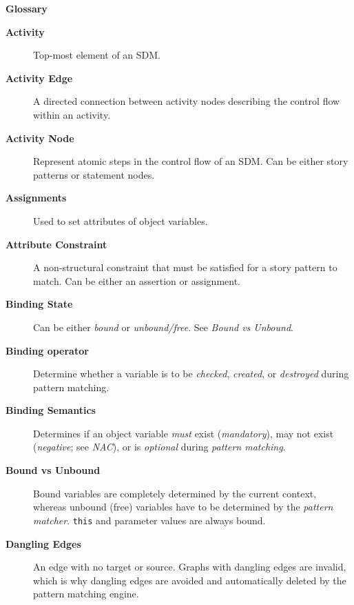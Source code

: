 \newpage
{}
{}
\hypertarget{glossary}{}

\vspace{1cm}
{\Huge \bf Glossary}
\vspace{1cm}

\begin{description}

\item[\bf Activity]
Top-most element of an SDM.

\item[\bf Activity Edge]
A directed connection between activity nodes describing the control flow within an activity.

\item[\bf Activity Node]
Represent atomic steps in the control flow of an SDM. Can be either story patterns or statement nodes.

\item[\bf Assignments]
Used to set attributes of object variables.

\item[\bf Attribute Constraint]
A non-structural constraint that must be satisfied for a story pattern to match. Can be either an assertion or assignment.

\item[\bf Binding State]
Can be either \emph{bound} or \emph{unbound/free}. See \emph{Bound vs Unbound}.

\item[\bf Binding operator]
Determine whether a variable is to be \emph{checked}, \emph{created}, or \emph{destroyed} during pattern matching.

\item[\bf Binding Semantics]
Determines if an object variable \emph{must} exist (\emph{mandatory}), may not exist (\emph{negative}; see \emph{NAC}), or is \emph{optional} during
\emph{pattern matching}.

\item[\bf Bound vs Unbound]
Bound variables are completely determined by the current context, whereas unbound (free) variables have to be determined by the \emph{pattern matcher}.
\texttt{this} and parameter values are always bound.

\item[\bf Dangling Edges]
An edge with no target or source. Graphs with dangling edges are invalid, which is why dangling edges are avoided and automatically deleted by the pattern
matching engine.


\end{description}
